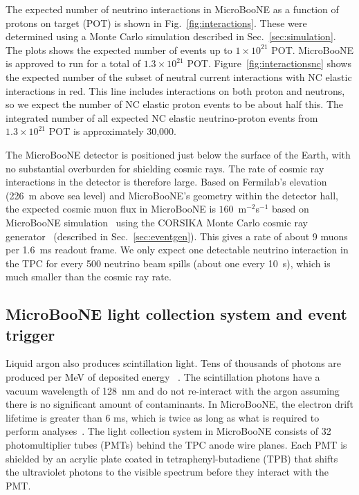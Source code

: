  The expected number of neutrino interactions in MicroBooNE as a function of
  protons on target (POT) is shown in Fig.~\ref{fig:interactions}. These were
  determined using a Monte Carlo simulation described in
  Sec.~\ref{sec:simulation}. The plots shows the expected number of events up
  to $1\times 10^{21}$ POT. MicroBooNE is approved to run for a total of
  $1.3\times 10^{21}$ POT. Figure~\ref{fig:interactionsnc} shows the expected
  number of the subset of neutral current interactions with NC elastic
  interactions in red. This line includes interactions on both proton and
  neutrons, so we expect the number of NC elastic proton events to be about
  half this. The integrated number of all expected NC elastic neutrino-proton
  events from $1.3\times 10^{21}$ POT is approximately 30,000.

  The MicroBooNE detector is positioned just below the surface of the Earth,
  with no substantial overburden for shielding cosmic rays. The rate of cosmic
  ray interactions in the detector is therefore large. Based on Fermilab's
  elevation (226~m above sea level) and MicroBooNE's geometry within the
  detector hall, the expected cosmic muon flux in MicroBooNE is
  $160$~m$^{-2}$s$^{-1}$ based on MicroBooNE simulation~\cite{uBCosmicNote}
  using the CORSIKA Monte Carlo cosmic ray generator~\cite{Heck:1998vt}
  (described in Sec.~\ref{sec:eventgen}). This gives a rate of about 9 muons
  per 1.6~ms readout frame. We only expect one detectable neutrino interaction
  in the TPC for every 500 neutrino beam spills (about one every 10~s), which
  is much smaller than the cosmic ray rate.

\subsection{MicroBooNE light collection system and event trigger}\label{sec:swtrigger}
  Liquid argon also produces scintillation light. Tens of thousands of photons
  are produced per MeV of deposited energy ~\cite{Acciarri:2016smi}. The
  scintillation photons have a vacuum wavelength of 128~nm and do not
  re-interact with the argon assuming there is no significant amount of
  contaminants. In MicroBooNE, the electron drift lifetime is greater than 6
  ms, which is twice as long as what is required to perform
  analyses~\cite{uBPurityNote}. The light collection system in MicroBooNE
  consists of 32 photomultiplier tubes (PMTs) behind the TPC anode wire planes.
  Each PMT is shielded by an acrylic plate coated in tetraphenyl-butadiene
  (TPB) that shifts the ultraviolet photons to the visible spectrum before they
  interact with the PMT.

